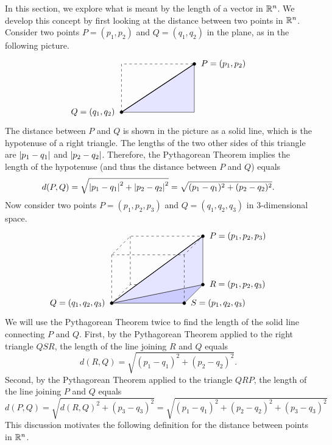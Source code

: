 In this section, we explore what is meant by the length of a vector in
$\mathbb{R}^n$.  We develop this concept by first looking at the distance
between two points in $\mathbb{R}^n$. Consider two points $P=(p_1,p_2)$ and
$Q=(q_1,q_2)$ in the plane, as in the following picture.
\begin{equation*}
  \begin{tikzpicture}[scale=1]
    \draw[dashed] (0,0) -- (0,2) -- (3,2);
    \draw[fill=blue!10] (0,0) -- (3,0) -- (3,2) -- cycle;
    \draw[thick] (0,0) -- (3,2);
    \draw[fill](0,0) circle [radius=1.8pt] node[left=1ex]{$Q=(q_1,q_2)$};
    \draw[fill](3,2) circle [radius=1.8pt] node[right=1ex]{$P=(p_1,p_2)$};
  \end{tikzpicture}
\end{equation*}
The distance between $P$ and $Q$ is shown in the picture as a solid
line, which is the hypotenuse of a right triangle.  The lengths of the
two other sides of this triangle are $\left|p_1-q_1\right|$ and
$\left|p_2-q_2\right|$. Therefore, the Pythagorean Theorem implies the
length of the hypotenuse (and thus the distance between $P$ and $Q$)
equals
\begin{equation*}
  d(P,Q)
  =\sqrt{\left|p_1-q_1\right|^2+\left|p_2-q_2\right|^2}
  =\sqrt{(p_1-q_1)^2+(p_2-q_2)^2}.
\end{equation*}
Now consider two points $P=(p_1,p_2,p_3)$ and
$Q = (q_1,q_2,q_3)$ in $3$-dimensional space.
\begin{equation*}
  \begin{tikzpicture}[scale=1]
    \draw[dashed] (3,0,-2) -- (0,0,-2) -- (0,0,0);
    \draw[dashed] (0,0,0) -- (0,2,0);
    \draw[dashed] (0,0,-2) -- (0,2,-2);
    \draw[fill=blue!20] (0,0,0) -- (3,0,0) -- (3,0,-2) -- cycle;
    \draw[fill=blue!10] (0,0,0) -- (3,0,-2) -- (3,2,-2) -- cycle;
    \draw[dashed] (0,2,0) -- (3,2,0) -- (3,2,-2) -- (0,2,-2) -- cycle;
    \draw[dashed] (3,0,0) -- (3,2,0);
    \draw[thick] (0,0,0) -- (3,2,-2);
    \draw[fill](0,0,0) circle [radius=1.8pt] node[left=1ex]{$Q=(q_1,q_2,q_3)$};
    \draw[fill](3,2,-2) circle [radius=1.8pt] node[right=1ex]{$P=(p_1,p_2,p_3)$};
    \draw[fill](3,0,-2) circle [radius=1.8pt] node[right=1ex]{$R=(p_1,p_2,q_3)$};
    \draw[fill](3,0,0) circle [radius=1.8pt] node[right=1ex]{$S=(p_1,q_2,q_3)$};
  \end{tikzpicture}
\end{equation*}
We will use the Pythagorean Theorem twice to find the length of the
solid line connecting $P$ and $Q$. First, by the Pythagorean Theorem
applied to the right triangle $QSR$, the length of the line joining
$R$ and $Q$ equals
\begin{equation*}
  d(R,Q) = \sqrt{(p_1-q_1)^2+(p_2-q_2)^2}.
\end{equation*}
Second, by the Pythagorean Theorem applied to the triangle $QRP$, the
length of the line joining $P$ and $Q$ equals
\begin{equation*}
  d(P,Q)=\sqrt{d(R,Q)^2+(p_3-q_3)^2}
  =\sqrt{(p_1-q_1)^2+(p_2-q_2)^2+(p_3-q_3)^2}
\end{equation*}
This discussion motivates the following definition for the distance
between points in $\mathbb{R}^n$.

